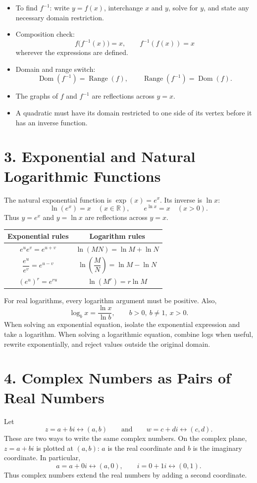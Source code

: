\documentclass[12pt]{article}
\begin{document}
\begin{itemize}[leftmargin=1.5em,itemsep=0.25em]
  \item To find $f^{-1}$: write $y=f(x)$, interchange $x$ and $y$, solve for $y$, and state any necessary domain restriction.
  \item Composition check:
  \[
    f\bigl(f^{-1}(x)\bigr)=x,\qquad f^{-1}(f(x))=x
  \]
  wherever the expressions are defined.
  \item Domain and range switch:
  \[
    \operatorname{Dom}(f^{-1})=\operatorname{Range}(f),\qquad
    \operatorname{Range}(f^{-1})=\operatorname{Dom}(f).
  \]
  \item The graphs of $f$ and $f^{-1}$ are reflections across $y=x$.
  \item A quadratic must have its domain restricted to one side of its vertex before it has an inverse function.
\end{itemize}

\section*{3. Exponential and Natural Logarithmic Functions}
The natural exponential function is $\exp(x)=e^x$. Its inverse is $\ln x$:
\[
  \ln(e^x)=x\quad(x\in\mathbb R),
  \qquad
  e^{\ln x}=x\quad(x>0).
\]
Thus $y=e^x$ and $y=\ln x$ are reflections across $y=x$.

\begin{center}
\begin{tabular}{c|c}
Exponential rules & Logarithm rules\\ \hline
$e^u e^v=e^{u+v}$ & $\ln(MN)=\ln M+\ln N$\\
$\dfrac{e^u}{e^v}=e^{u-v}$ & $\ln\!\left(\dfrac MN\right)=\ln M-\ln N$\\
$(e^u)^r=e^{ru}$ & $\ln(M^r)=r\ln M$
\end{tabular}
\end{center}
For real logarithms, every logarithm argument must be positive. Also,
\[
  \log_b x=\frac{\ln x}{\ln b},\qquad b>0,\ b\ne1,\ x>0.
\]
When solving an exponential equation, isolate the exponential expression and take a logarithm. When solving a logarithmic equation, combine logs when useful, rewrite exponentially, and reject values outside the original domain.

\section*{4. Complex Numbers as Pairs of Real Numbers}
Let
\[
  z=a+bi\longleftrightarrow(a,b)
  \qquad\text{and}\qquad
  w=c+di\longleftrightarrow(c,d).
\]
These are two ways to write the same complex numbers. On the complex plane, $z=a+bi$ is plotted at $(a,b)$: $a$ is the real coordinate and $b$ is the imaginary coordinate. In particular,
\[
  a=a+0i\longleftrightarrow(a,0),
  \qquad i=0+1i\longleftrightarrow(0,1).
\]
Thus complex numbers extend the real numbers by adding a second coordinate.
\end{document}
